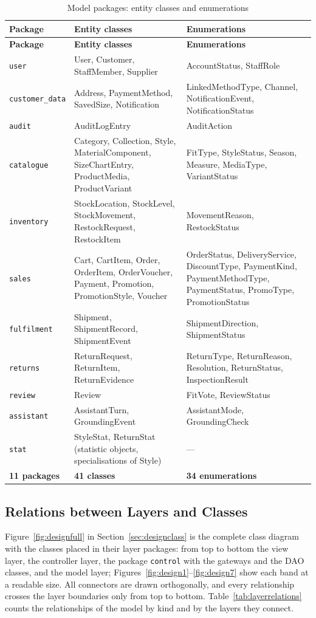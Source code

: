 {\small
\begin{xltabular}{\textwidth}{@{}L{2.4cm} Y L{5.0cm}@{}}
\caption{Model packages: entity classes and enumerations}\label{tab:modelpackages}\\
\toprule
\textbf{Package} & \textbf{Entity classes} & \textbf{Enumerations} \\ \midrule
\endfirsthead
\toprule
\textbf{Package} & \textbf{Entity classes} & \textbf{Enumerations} \\ \midrule
\endhead
\bottomrule
\endlastfoot
\texttt{user} & User, Customer, StaffMember, Supplier & AccountStatus, StaffRole \\
\texttt{customer\_data} & Address, PaymentMethod, SavedSize, Notification & LinkedMethodType, Channel, NotificationEvent, NotificationStatus \\
\texttt{audit} & AuditLogEntry & AuditAction \\
\texttt{catalogue} & Category, Collection, Style, MaterialComponent, SizeChartEntry, ProductMedia, ProductVariant & FitType, StyleStatus, Season, Measure, MediaType, VariantStatus \\
\texttt{inventory} & StockLocation, StockLevel, StockMovement, RestockRequest, RestockItem & MovementReason, RestockStatus \\
\texttt{sales} & Cart, CartItem, Order, OrderItem, OrderVoucher, Payment, Promotion, PromotionStyle, Voucher & OrderStatus, DeliveryService, DiscountType, PaymentKind, PaymentMethodType, PaymentStatus, PromoType, PromotionStatus \\
\texttt{fulfilment} & Shipment, ShipmentRecord, ShipmentEvent & ShipmentDirection, ShipmentStatus \\
\texttt{returns} & ReturnRequest, ReturnItem, ReturnEvidence & ReturnType, ReturnReason, Resolution, ReturnStatus, InspectionResult \\
\texttt{review} & Review & FitVote, ReviewStatus \\
\texttt{assistant} & AssistantTurn, GroundingEvent & AssistantMode, GroundingCheck \\
\texttt{stat} & StyleStat, ReturnStat (statistic objects, specialisations of Style) & --- \\ \midrule
\textbf{11 packages} & \textbf{41 classes} & \textbf{34 enumerations} \\
\end{xltabular}
}

\subsection{Relations between Layers and Classes}
\label{subsec:layerrelations}
\label{fig:layeredclass}
Figure~\ref{fig:designfull} in Section~\ref{sec:designclass} is the complete class diagram with the classes placed in their layer packages: from top to bottom the view layer, the controller layer, the package \texttt{control} with the gateways and the DAO classes, and the model layer; Figures~\ref{fig:design1}--\ref{fig:design7} show each band at a readable size. All connectors are drawn orthogonally, and every relationship crosses the layer boundaries only from top to bottom. Table~\ref{tab:layerrelations} counts the relationships of the model by kind and by the layers they connect.

